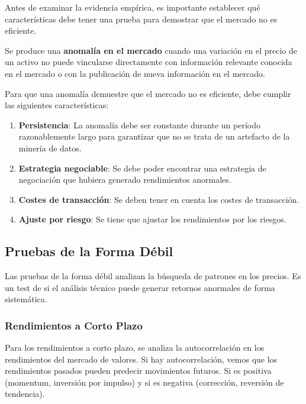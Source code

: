 Antes de examinar la evidencia empírica, es importante establecer qué características debe tener una prueba para demostrar que el mercado no es eficiente.

\begin{definicion}
Se produce una \textbf{anomalía en el mercado} cuando una variación en el precio de un activo no puede vincularse directamente con información relevante conocida en el mercado o con la publicación de nueva información en el mercado.
\end{definicion}

Para que una anomalía demuestre que el mercado no es eficiente, debe cumplir las siguientes características:

\begin{enumerate}
\item \textbf{Persistencia}: La anomalía debe ser constante durante un período razonablemente largo para garantizar que no se trata de un artefacto de la minería de datos.

\item \textbf{Estrategia negociable}: Se debe poder encontrar una estrategia de negociación que hubiera generado rendimientos anormales.

\item \textbf{Costes de transacción}: Se deben tener en cuenta los costes de transacción.

\item \textbf{Ajuste por riesgo}: Se tiene que ajustar los rendimientos por los riesgos.
\end{enumerate}

\subsection{Pruebas de la Forma Débil}

Las pruebas de la forma débil analizan la búsqueda de patrones en los precios. Es un test de si el análisis técnico puede generar retornos anormales de forma sistemática.

\subsubsection{Rendimientos a Corto Plazo}

Para los rendimientos a corto plazo, se analiza la autocorrelación en los rendimientos del mercado de valores. Si hay autocorrelación, vemos que los rendimientos pasados pueden predecir movimientos futuros. Si es positiva (momentum, inversión por impulso) y si es negativa (corrección, reversión de tendencia).

